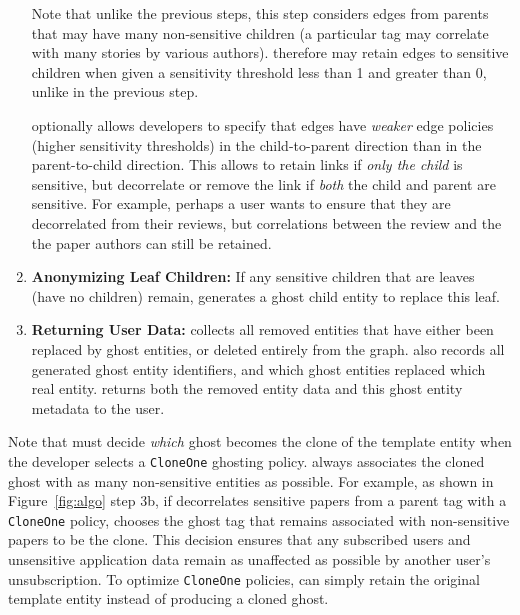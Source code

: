 \begin{enumerate}
        Note that unlike the previous steps, this step considers edges from parents that may have
        many non-sensitive children (\eg a particular tag may correlate with many stories by various
        authors).  \sys therefore may retain edges to sensitive children when given a sensitivity
        threshold less than 1 and greater than 0, unlike in the previous step.

        \sys optionally allows developers to specify that edges have \emph{weaker} edge policies
        (\ie higher sensitivity thresholds) in the child-to-parent direction than in the  
        parent-to-child direction. This allows \sys to retain links if \emph{only the
        child} is sensitive, but decorrelate or remove the link if \emph{both} the
        child and parent are sensitive. For example, perhaps a user wants to ensure that they are
        decorrelated from their reviews, but correlations between the review and the the paper
        authors can still be retained.

    \item \textbf{Anonymizing Leaf Children:}
        If any sensitive children that are leaves (have no children) remain, \sys generates a ghost child entity to replace this leaf.

    \item \textbf{Returning User Data:} \sys collects all removed entities that have either been
        replaced by ghost entities, or deleted entirely from the graph. \sys also records all
        generated ghost entity identifiers, and which ghost entities replaced which real entity.
        \sys returns both the removed entity data and this ghost entity metadata to the user.
\end{enumerate}

Note that \sys must decide \emph{which} ghost becomes the clone of the template entity when the
developer selects a \texttt{CloneOne} ghosting policy. \sys always associates the cloned ghost with
as many non-sensitive entities as possible. For example, as shown in Figure~\ref{fig:algo} step 3b,
if \sys decorrelates sensitive papers from a parent tag with a \texttt{CloneOne} policy, \sys
chooses the ghost tag that remains associated with non-sensitive papers to be the clone. This
decision ensures that any subscribed users and unsensitive application data remain as unaffected as
possible by another user's unsubscription. To optimize \texttt{CloneOne} policies, \sys can simply
retain the original template entity instead of producing a cloned ghost.

